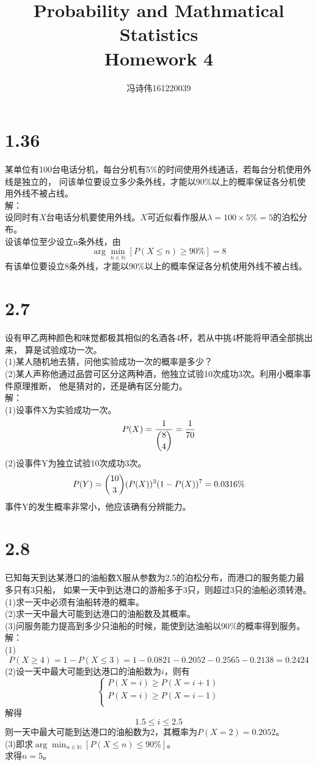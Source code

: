 \documentclass[a4papers]{ctexart}
\title{Probability and Mathmatical Statistics \\Homework 4}
\author{冯诗伟161220039}
\date{}
\begin{document}
\maketitle
\section{1.36}
某单位有100台电话分机，每台分机有5\%的时间使用外线通话，若每台分机使用外线是独立的，
问该单位要设立多少条外线，才能以90\%以上的概率保证各分机使用外线不被占线。\\
解：\\
设同时有$X$台电话分机要使用外线。$X$可近似看作服从$\lambda=100\times 5\%=5$的泊松分布。\\
设该单位至少设立n条外线，由
\[
    \arg \min_{n \in \mathbb{N}}\left[P(X\le n)\ge 90\% \right]=8
\]
有该单位要设立8条外线，才能以90\%以上的概率保证各分机使用外线不被占线。
\section{2.7}
设有甲乙两种颜色和味觉都极其相似的名酒各4杯，若从中挑4杯能将甲酒全部挑出来，
算是试验成功一次。\\
(1)某人随机地去猜，问他实验成功一次的概率是多少？\\
(2)某人声称他通过品尝可区分这两种酒，他独立试验10次成功3次。利用小概率事件原理推断，
他是猜对的，还是确有区分能力。\\
解：\\
(1)设事件X为实验成功一次。
\[P(X)=\dfrac{1}{\dbinom{8}{4}} = \dfrac{1}{70}\]
(2)设事件Y为独立试验10次成功3次。
\[P(Y)=\dbinom{10}{3}(P(X))^3(1-P(X))^7=0.0316\%\]
事件Y的发生概率非常小，他应该确有分辨能力。\\

\section{2.8}
已知每天到达某港口的油船数X服从参数为2.5的泊松分布，而港口的服务能力最多只有3只船，
如果一天中到达港口的游船多于3只，则超过3只的油船必须转港。\\
(1)求一天中必须有油船转港的概率。\\
(2)求一天中最大可能到达港口的油船数及其概率。\\
(3)问服务能力提高到多少只油船的时候，能使到达油船以90\%的概率得到服务。\\
解：\\
(1)\[P(X\ge4)=1-P(X\le3)=1-0.0821-0.2052-0.2565-0.2138=0.2424\]
(2)设一天中最大可能到达港口的油船数为$i$，则有\\
\[\begin{cases}
    P(X=i)\ge P(X=i+1)\\
    P(X=i)\ge P(X=i-1)\\
\end{cases}\]
解得\[1.5\le i \le 2.5\]
则一天中最大可能到达港口的油船数为$2$，其概率为$P(X=2)=0.2052$。\\
(3)即求$\arg\min_{n\in \mathbb{N}}\left[P(X \le n)\le 90\%\right]$。\\
求得$n=5$。
\end{document}

